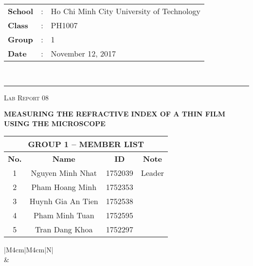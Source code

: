\documentclass[12pt, a4paper]{article}
\begin{document}
\noindent
\begin{tabular}{lll}
    \textbf{School} & : & Ho Chi Minh City University of Technology \\
    \textbf{Class} & : & PH1007 \\
    \textbf{Group} & : & 1 \\
    \textbf{Date} & : & November 12, 2017 \\
\end{tabular}\\
\rule[2ex]{\textwidth}{2pt}

\vspace{2cm}

\begin{center}
    {\scshape\Large Lab Report 08 \par}
    \vspace{1.5cm}
    {\Huge\bfseries MEASURING THE REFRACTIVE INDEX OF A THIN FILM USING THE MICROSCOPE \par}
    \vspace{3cm}
    \begin{tabular}{|c|c|c|c|}
        \hline 
        \multicolumn{4}{|c|}{\textbf{GROUP 1 -- MEMBER LIST}} \\ 
        \hline 
        \textbf{No.} &\qquad\qquad \textbf{Name}\qquad\qquad\qquad & \qquad\textbf{ID}\qquad\qquad & \qquad\textbf{Note}\qquad\qquad \\ 
        \hline 
        1 & Nguyen Minh Nhat  & 1752039 & Leader \\ 
        \hline 
        2 & Pham Hoang Minh   & 1752353 &  \\ 
        \hline 
        3 & Huynh Gia An Tien & 1752538 &  \\ 
        \hline 
        4 & Pham Minh Tuan    & 1752595 &  \\ 
        \hline 
        5 & Tran Dang Khoa    & 1752297 &  \\ 
        \hline 
    \end{tabular} 

    \vspace{3cm}

    \begin{table}[ht]
        \centering
        \begin{tabular}{|M{4cm}|M{4cm}|N|}
            \hline
             \\
            \hline
             &  \\ [50pt]
            \hline
        \end{tabular}
    \end{table}
\end{center}
\end{document}
